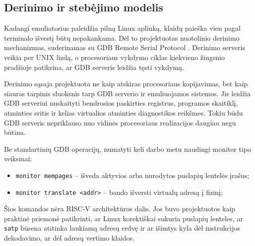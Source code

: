 \subsection{Derinimo ir stebėjimo modelis}
\label{sec:derinimo-modelis}

Kadangi emuliatorius paleidžia pilną Linux aplinką, klaidų paieška vien pagal terminalo išvestį būtų nepakankama. Dėl to projektuotas nuotolinio derinimo mechanizmas, suderinamas su GDB Remote Serial Protocol \cite{gdb_remote_protocol}. Derinimo serveris veikia per UNIX lizdą, o procesoriaus vykdymo ciklas kiekvieno žingsnio pradžioje patikrina, ar GDB serveris leidžia tęsti vykdymą.

Derinimo sąsaja projektuota ne kaip atskiras procesoriaus kopijavimas, bet kaip siauras tarpinis sluoksnis tarp GDB serverio ir emuliuojamos sistemos. Jis leidžia GDB serveriui nuskaityti bendrosios paskirties registrus, programos skaitiklį, atminties sritis ir kelias virtualios atminties diagnostikos reikšmes. Tokiu būdu GDB serveris nepriklauso nuo vidinės procesoriaus realizacijos daugiau negu būtina.

Be standartinių GDB operacijų, numatyti keli darbo metu naudingi monitor tipo veiksmai:

\begin{itemize}
    \item \texttt{monitor mempages} -- išveda aktyvios arba nurodytos puslapių lentelės įrašus;
    \item \texttt{monitor translate <addr>} -- bando išversti virtualų adresą į fizinį;
\end{itemize}

Šios komandos nėra RISC-V architektūros dalis. Jos buvo projektuotos kaip praktinė priemonė patikrinti, ar Linux korektiškai sukuria puslapių lenteles, ar \texttt{satp} būsena atitinka laukiamą adresų erdvę ir ar išimtys kyla dėl instrukcijos dekodavimo, ar dėl adresų vertimo klaidos.
